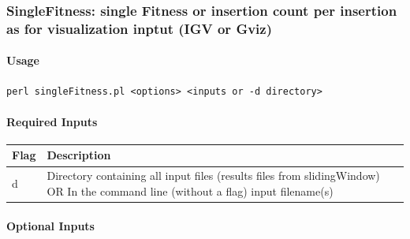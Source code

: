 \documentclass[11pt,]{article}
\let\oldparagraph\paragraph
\renewcommand{\paragraph}[1]{\oldparagraph{#1}\mbox{}}
\begin{document}
\subsubsection{SingleFitness: single Fitness or insertion count per
insertion as for visualization inptut (IGV or
Gviz)}\label{singlefitness-single-fitness-or-insertion-count-per-insertion-as-for-visualization-inptut-igv-or-gviz}

\paragraph{Usage}\label{usage-7}

\begin{verbatim}
perl singleFitness.pl <options> <inputs or -d directory>
\end{verbatim}

\paragraph{Required Inputs}\label{required-inputs-7}

\begin{longtable}[]{@{}ll@{}}
\toprule
\begin{minipage}[b]{0.05\columnwidth}\raggedright\strut
Flag\strut
\end{minipage} & \begin{minipage}[b]{0.89\columnwidth}\raggedright\strut
Description\strut
\end{minipage}\tabularnewline
\midrule
\endhead
\begin{minipage}[t]{0.05\columnwidth}\raggedright\strut
d\strut
\end{minipage} & \begin{minipage}[t]{0.89\columnwidth}\raggedright\strut
Directory containing all input files (results files from slidingWindow)
OR In the command line (without a flag) input filename(s)\strut
\end{minipage}\tabularnewline
\bottomrule
\end{longtable}

\paragraph{Optional Inputs}\label{optional-inputs-7}
\end{document}
